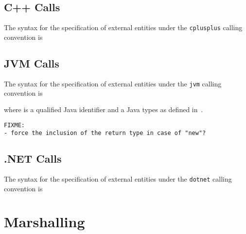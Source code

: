 \documentclass[a4paper,twoside]{article}
\newcommand{\code}[1]{\texttt{#1}}      %
\begin{document}
\begin{FUTURE} %

\subsection{C{+}{+} Calls}

The syntax for the specification of external entities under the
\code{cplusplus} calling convention is

\subsection{JVM Calls}

The syntax for the specification of external entities under the \code{jvm}
calling convention is 
%
\begin{grammar}
\end{grammar}
%
where  is a qualified Java identifier and  a Java
types as defined in~\cite{gosling-etal:Java}.

\begin{verbatim}
FIXME: 
- force the inclusion of the return type in case of "new"?
\end{verbatim}

\subsection{.NET Calls}

The syntax for the specification of external entities under the \code{dotnet}
calling convention is

\end{FUTURE}%


\newpage
\section{Marshalling}
\label{sec:marshalling}
\end{document}
